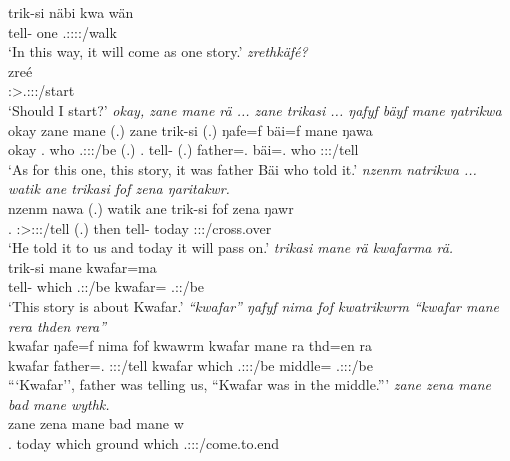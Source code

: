 \begin{exe}
	\gll trik-si näbi kwa wän\\ 
	tell-\Nmlz{} one \Fut{} \Tsg.\F:\Sbj:\Nonpast:\Ipfv:\Venit/walk\\
	\trans `In this way, it will come as one story.'
	\emph{zrethkäfé?}\\
	\gll zreé\\ 
	\Fsg:\Sbj>\Tsg.\F:\Obj:\Irr:\Pfv/start\\
	\trans `Should I start?'
	\emph{okay, zane mane rä ... zane trikasi ... ŋafyf bäyf mane ŋatrikwa}\\
	\gll okay zane mane  (.) zane trik-si (.) ŋafe=f bäi=f mane ŋawa\\ 
	okay \Dem.\Prox{} who \Tsg.\F:\Sbj:\Nonpast:\Ipfv/be (.) \Dem.\Prox{} tell-\Nmlz{} (.) father=\Erg.\Sg{} bäi=\Erg.\Sg{} who \Sg:\Sbj:\Pst:\Ipfv/tell\\
	\trans `As for this one, this story, it was father Bäi who told it.'
	\emph{nzenm natrikwa ... watik ane trikasi fof zena ŋaritakwr.}\\
	\gll nzenm nawa (.) watik ane trik-si fof zena ŋawr\\ 
	\Fnsg.\Dat{} \Sg:\Sbj>\Fpl:\Io:\Pst:\Ipfv/tell (.) then \Dem{} tell-\Nmlz{} \Emph{} today \Stsg:\Sbj:\Nonpast:\Ipfv/cross.over\\
	\trans `He told it to us and today it will pass on.'
	\emph{trikasi mane rä kwafarma rä.}\\
	\gll trik-si mane  kwafar=ma \\ 
	tell-\Nmlz{} which \Tsg.\F:\Nonpast:\Ipfv/be kwafar=\Char{} \Tsg.\F:\Nonpast:\Ipfv/be\\
	\trans `This story is about Kwafar.'
	\emph{``kwafar'' ŋafyf nima fof kwatrikwrm ``kwafar mane rera thden rera''}\\
	\gll kwafar ŋafe=f nima fof kwawrm kwafar mane ra thd=en ra\\ 
	kwafar father=\Erg.\Sg{} \Quot{} \Emph{} \Sg:\Sbj:\Pst:\Dur/tell kwafar which \Tsg.\F:\Sbj:\Pst:\Ipfv/be middle=\Loc{} \Tsg.\F:\Sbj:\Pst:\Ipfv/be\\
	\trans ```Kwafar'', father was telling us, ``Kwafar was in the middle.'''
	\emph{zane zena mane bad mane wythk.}\\
	\gll zane zena mane bad mane w\\ 
	\Dem.\Prox{} today which ground which \Tsg.\F:\Sbj:\Nonpast:\Ipfv/come.to.end\\

\end{exe}
